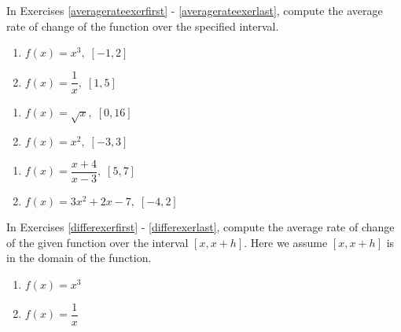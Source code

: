 \begin{enumerate}
\begin{center}
\end{center}

\setcounter{HW}{\value{enumi}}
\end{enumerate}

In Exercises \ref{averagerateexerfirst} - \ref{averagerateexerlast}, compute the average rate of change of the  function over the specified interval.

\begin{multicols}{2}
\begin{enumerate}
\setcounter{enumi}{\value{HW}}

\item $f(x) = x^{3}, \; [-1, 2]$  \label{averagerateexerfirst}
\item $f(x) = \dfrac{1}{x}, \; [1, 5]$

\setcounter{HW}{\value{enumi}}
\end{enumerate}
\end{multicols}

\begin{multicols}{2}
\begin{enumerate}
\setcounter{enumi}{\value{HW}}

\item $f(x) = \sqrt{x}, \; [0, 16]$
\item $f(x) = x^{2}, \; [-3, 3]$

\setcounter{HW}{\value{enumi}}
\end{enumerate}
\end{multicols}

\begin{multicols}{2}
\begin{enumerate}
\setcounter{enumi}{\value{HW}}

\item $f(x) = \dfrac{x + 4}{x - 3}, \; [5, 7]$
\item $f(x) = 3x^{2} + 2x - 7, \; [-4, 2]$  \label{averagerateexerlast}

\setcounter{HW}{\value{enumi}}
\end{enumerate}
\end{multicols}

\pagebreak

In Exercises \ref{differexerfirst} - \ref{differexerlast}, compute the average rate of change of the given function over the interval $[x, x + h]$.  Here we assume $[x, x + h]$ is in the domain of the function.

\begin{multicols}{2}
\begin{enumerate}
\setcounter{enumi}{\value{HW}}

\item $f(x) = x^{3}$  \label{differexerfirst}
\item $f(x) = \dfrac{1}{x}$

\setcounter{HW}{\value{enumi}}
\end{enumerate}
\end{multicols}

